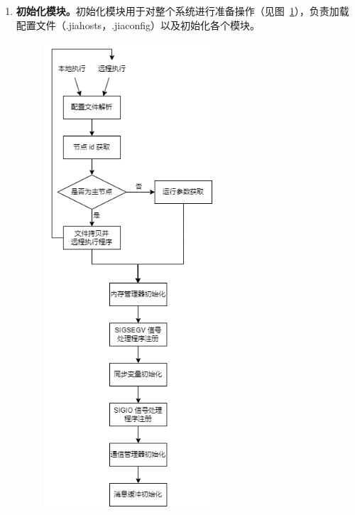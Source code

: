 {    \begin{enumerate}[label=\arabic*.]
        \item \textbf{初始化模块。}初始化模块用于对整个系统进行准备操作（见图~\ref{fig:JIAJIA-init}），负责加载配置文件（.jiahosts，.jiaconfig）以及初始化各个模块。
              \begin{figure}[!htbp]
                  \centering
                  \includegraphics[width=0.6\textwidth]{Img/JIAJIA-init.png}
                  \label{fig:JIAJIA-init}
              \end{figure}


\end{enumerate}}

